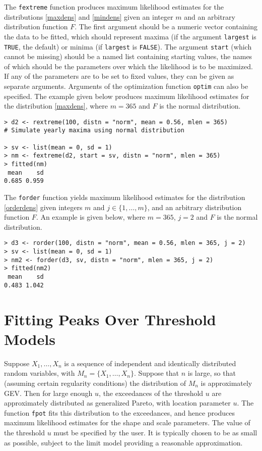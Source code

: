\documentclass[11pt,a4paper]{article}
\begin{document}
The \verb+fextreme+ function produces maximum likelihood estimates for the distributions \eqref{maxdens} and \eqref{mindens} given an integer $m$ and an arbitrary distribution function $F$.
The first argument should be a numeric vector containing the data to be fitted, which should represent maxima (if the argument \verb+largest+ is \verb+TRUE+, the default) or minima (if \verb+largest+ is \verb+FALSE+).
The argument \verb+start+ (which cannot be missing) should be a named list containing starting values, the names of which should be the parameters over which the likelihood is to be maximized.
If any of the parameters are to be set to fixed values, they can be given as separate arguments.
Arguments of the optimization function \verb+optim+ can also be specified.
The example given below produces maximum likelihood estimates for the distribution \eqref{maxdens}, where $m = 365$ and $F$ is the normal distribution.

\begin{verbatim}
> d2 <- rextreme(100, distn = "norm", mean = 0.56, mlen = 365)
# Simulate yearly maxima using normal distribution
 
> sv <- list(mean = 0, sd = 1)
> nm <- fextreme(d2, start = sv, distn = "norm", mlen = 365)
> fitted(nm)
 mean    sd
0.685 0.959
\end{verbatim}

The \verb+forder+ function yields maximum likelihood estimates for the distribution \eqref{orderdens} given integers $m$ and $j \in \{1,\dots,m\}$, and an arbitrary distribution function $F$.
An example is given below, where $m = 365$, $j = 2$ and $F$ is the normal distribution.
\begin{verbatim}
> d3 <- rorder(100, distn = "norm", mean = 0.56, mlen = 365, j = 2)
> sv <- list(mean = 0, sd = 1) 
> nm2 <- forder(d3, sv, distn = "norm", mlen = 365, j = 2)
> fitted(nm2)
 mean    sd 
0.483 1.042 
\end{verbatim}


\section{Fitting Peaks Over Threshold Models}
\setcounter{footnote}{0}
\label{potfit}

Suppose $X_1,\dots,X_n$ is a sequence of independent and identically distributed random variables, with $M_n = \{X_1,\dots,X_n\}$. Suppose that $n$ is large, so that (assuming certain regularity conditions) the distribution of $M_n$ is approximately GEV\@. Then for large enough $u$, the exceedances of the threshold $u$ are approximately distributed as generalized Pareto, with location parameter $u$. The function \verb+fpot+ fits this distribution to the exceedances, and hence produces maximum likelihood estimates for the shape and scale parameters. The value of the threshold $u$ must be specified by the user. It is typically chosen to be as small as possible, subject to the limit model providing a reasonable approximation. 
\end{document}
